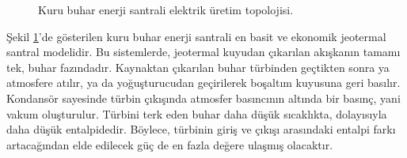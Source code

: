 \begin{figure}[htbp]


\caption{Kuru buhar enerji santrali elektrik üretim topolojisi.}
\label{fig:kurubuhar}
\end{figure}

Şekil \ref{fig:kurubuhar}'de gösterilen kuru buhar enerji santrali en basit ve ekonomik jeotermal santral modelidir. Bu sistemlerde, jeotermal kuyudan çıkarılan akışkanın tamamı tek, buhar fazındadır. Kaynaktan çıkarılan buhar türbinden geçtikten sonra ya atmosfere atılır, ya da yoğuşturucudan geçirilerek boşaltım kuyusuna geri basılır. Kondansör sayesinde türbin çıkışında atmosfer basıncının altında bir basınç, yani vakum oluşturulur. Türbini terk eden buhar daha düşük sıcaklıkta, dolayısıyla daha düşük entalpidedir\cite{atalay}. Böylece, türbinin giriş ve çıkışı arasındaki entalpi farkı artacağından elde edilecek güç de en fazla değere ulaşmış olacaktır. 

